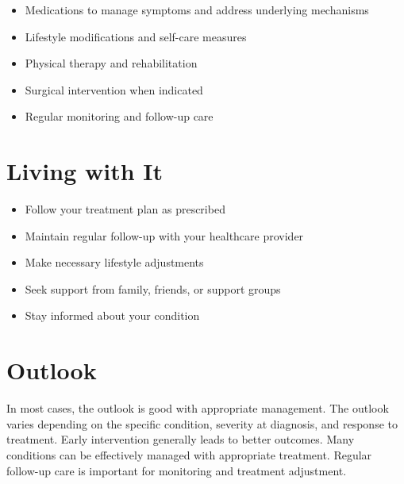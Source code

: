 \begin{itemize}[noitemsep]
  \item Medications to manage symptoms and address underlying mechanisms
  \item Lifestyle modifications and self-care measures
  \item Physical therapy and rehabilitation
  \item Surgical intervention when indicated
  \item Regular monitoring and follow-up care
\end{itemize}
\section{Living with It}
\begin{itemize}[noitemsep]
  \item Follow your treatment plan as prescribed
  \item Maintain regular follow-up with your healthcare provider
  \item Make necessary lifestyle adjustments
  \item Seek support from family, friends, or support groups
  \item Stay informed about your condition
\end{itemize}
\section{Outlook}
In most cases, the outlook is good with appropriate management. The outlook varies depending on the specific condition, severity at diagnosis, and response to treatment. Early intervention generally leads to better outcomes. Many conditions can be effectively managed with appropriate treatment. Regular follow-up care is important for monitoring and treatment adjustment.
